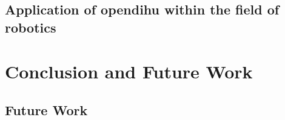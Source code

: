 \section{Application of opendihu within the field of robotics}

\chapter{Conclusion and Future Work}\label{sec:conclusion_and_future_work}

\section{Future Work}\label{sec:future_work}
 



\fi

